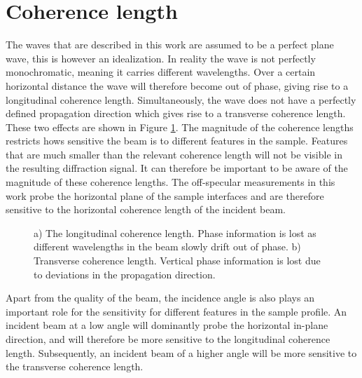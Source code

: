 \section{Coherence length}
The waves that are described in this work are assumed to be a perfect plane wave, this is however an idealization. In reality the wave is not perfectly monochromatic, meaning it carries different wavelengths. Over a certain horizontal distance the wave will therefore become out of phase, giving rise to a longitudinal coherence length. Simultaneously, the wave does not have a perfectly defined propagation direction which gives rise to a transverse coherence length. These two effects are shown in Figure \ref{coherencelength}. The magnitude of the coherence lengths restricts hows sensitive the beam is to different features in the sample. Features that are much smaller than the relevant coherence length will not be visible in the resulting diffraction signal. It can therefore be important to be aware of the magnitude of these coherence lengths. The off-specular measurements in this work probe the horizontal plane of the sample interfaces and are therefore sensitive to the horizontal coherence length of the incident beam.
\begin{figure}[b]
	\centering
	\def\svgwidth{\textwidth}
	
	\caption{a) The longitudinal coherence length. Phase information is lost as different wavelengths in the beam slowly drift out of phase. b) Transverse coherence length. Vertical phase information is lost due to deviations in the propagation direction.}
	\label{coherencelength}
\end{figure}
Apart from the quality of the beam, the incidence angle is also plays an important role for the sensitivity for different features in the sample profile. An incident beam at a low angle will dominantly probe the horizontal in-plane direction, and will therefore be more sensitive to the longitudinal coherence length. Subsequently, an incident beam of a higher angle will be more sensitive to the transverse coherence length.
